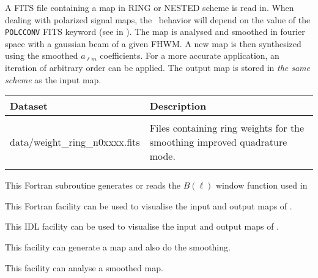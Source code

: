 \begin{codedescription}
{
A FITS file containing a \healpix map in RING or NESTED scheme is read in.
When dealing with polarized signal maps, the \thedocid\ behavior will depend on the value of the \texttt{POLCCONV} FITS keyword
(see  in ).
The map is analysed and smoothed in fourier space with a  gaussian beam 
of a given FHWM. 
A new map is then synthesized using the smoothed $a_{\ell m}$ coefficients. 
For a more accurate application, an iteration of arbitrary order can be applied. 
The output map is stored in {\em the same scheme} as the input map.
}
\end{codedescription}

\begin{datasets}
{
\begin{tabular}{p{0.3\hsize} p{0.35\hsize}} \hline  
  \textbf{Dataset} & \textbf{Description} \\ \hline
                   &                      \\ %
  data/weight\_ring\_n0xxxx.fits & Files containing ring weights
                   for the smoothing improved quadrature mode.\\ 
                   &                      \\ \hline %
\end{tabular}
} 
\end{datasets}

\begin{support}
  \begin{sulist}{} %
  \item[\htmlref{generate\_beam}{sub:generate_beam}] This \healpix Fortran
subroutine generates or reads the $B(\ell)$ window function used in \thedocid
  \item[\htmlref{map2gif}{fac:map2gif}] This \healpix Fortran facility can be used to visualise the
  input and output maps of \thedocid.
  \item[\htmlref{mollview}{idl:mollview}] This \healpix IDL facility can be used to visualise the
  input and output maps of \thedocid.
  \item[\htmlref{synfast}{fac:synfast}] This \healpix facility can generate a map and also do the smoothing.
  \item[\htmlref{anafast}{fac:anafast}] This \healpix facility can analyse a smoothed map.		
  \end{sulist}
\end{support}

